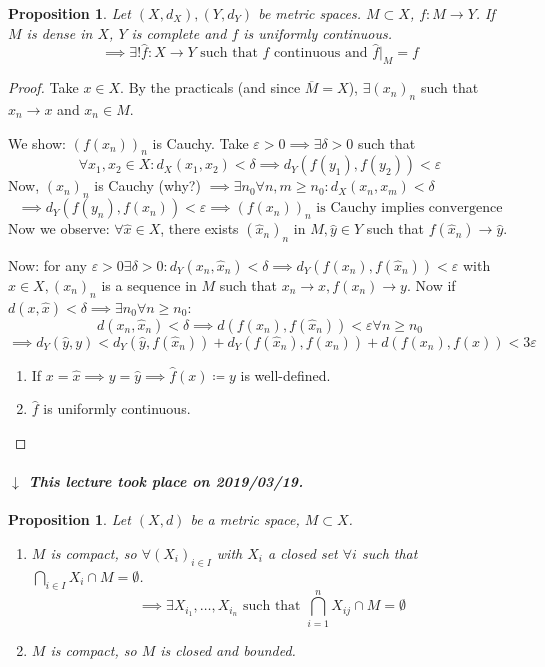 \documentclass{article}
\newcounter{lecref}[section]
\numberwithin{lecref}{section}
\newtheorem{proposition}[lecref]{Proposition}
\newcommand{\dateref}[1]{%
  \begin{mdframed}[backgroundcolor=gray!10,innerbottommargin=0pt,innertopmargin=0pt]
    \paragraph{\textit{$\downarrow$ This lecture took place on #1.}}%
  \end{mdframed}%
}
\begin{document}
\begin{proposition}
	\label{proposition:1.17}
	Let $(X, d_X), (Y, d_Y)$ be metric spaces. $M \subset X$, $f: M \to Y$.
	If $M$ is dense in $X$, $Y$ is complete and $f$ is uniformly continuous.
	\[ \implies \exists! \hat f: X \to Y \text{ such that } \hat f \text{ continuous and } \hat f |_M = f \]
\end{proposition}

\begin{proof}
	Take $x \in X$. By the practicals (and since $\overline M = X$), $\exists (x_n)_n$ such that $x_n \to x$ and $x_n \in M$.

	We show: $(f(x_n))_n$ is Cauchy. Take $\varepsilon > 0 \implies \exists \delta > 0$ such that
	\[ \forall x_1, x_2 \in X: d_X(x_1, x_2) < \delta \implies d_Y(f(y_1), f(y_2)) < \varepsilon \]
	Now, $(x_n)_n$ is Cauchy (why?) $\implies \exists n_0 \forall n, m \geq n_0: d_X(x_n, x_m) < \delta$
	\[ \implies d_Y(f(y_n), f(x_n)) < \varepsilon \implies (f(x_n))_n \text{ is Cauchy implies convergence} \]
	Now we observe: $\forall \hat x \in X$, there exists $(\hat x_n)_n$ in $M, \hat y \in Y$ such that $f(\hat x_n) \to \hat y$.

	Now: for any $\varepsilon > 0 \exists \delta > 0: d_Y(x_n, \hat x_n) < \delta \implies d_Y(f(x_n), f(\hat x_n)) < \varepsilon$
	with $x \in X, (x_n)_n$ is a sequence in $M$ such that $x_n \to x, f(x_n) \to y$.
	Now if $d(x, \hat x) < \delta \implies \exists n_0 \forall n \geq n_0$:
	\[ d(x_n, \hat x_n) < \delta \implies d(f(x_n), f(\hat x_n)) < \varepsilon \forall n \geq n_0 \]
	\[ \implies d_Y(\hat y, y) < d_Y(\hat y, f(\hat x_n)) + d_Y(f(\hat x_n), f(x_n)) + d(f(x_n), f(x)) < 3 \varepsilon \]
	\begin{enumerate}
		\item If $x = \hat x \implies y = \hat y \implies \hat f(x) \coloneqq y$ is well-defined.
		\item $\hat f$ is uniformly continuous.
	\end{enumerate}
\end{proof}

\dateref{2019/03/19}

\begin{proposition}
	\label{prop:1.18}
	Let $(X, d)$ be a metric space, $M \subset X$.
	\begin{enumerate}
		\item $M$ is compact, so $\forall (X_i)_{i \in I}$ with $X_i$ a closed set $\forall i$ such that $\bigcap_{i \in I} X_i \cap M = \emptyset$.
			\[ \implies \exists X_{i_1}, \dots, X_{i_n} \text{ such that } \bigcap_{i=1}^n X_{ij} \cap M = \emptyset \]
		\item $M$ is compact, so $M$ is closed and bounded.
	\end{enumerate}
\end{proposition}
\end{document}
